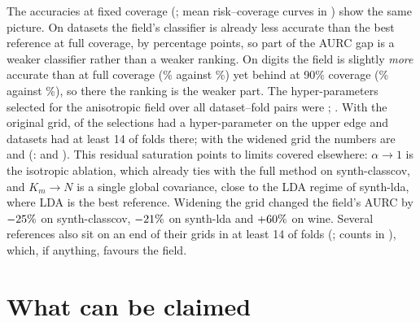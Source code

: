 \documentclass[10pt,a4paper]{article}
\theoremstyle{plain}
\theoremstyle{definition}
\theoremstyle{remark}
\begin{document}
The accuracies at fixed coverage (; mean risk--coverage curves in ) show the same picture. On \AccGapBigN{} datasets the field's classifier is already less accurate than the best reference at full coverage, by \AccGapBigText{} percentage points, so part of the AURC gap is a weaker classifier rather than a weaker ranking. On digits the field is slightly \emph{more} accurate than \BestRefDigits{} at full coverage (\AccDigitsFaniso\% against \AccDigitsDann\%) yet behind at 90\% coverage (\AccNinetyDigitsFaniso\% against \AccNinetyDigitsDann\%), so there the ranking is the weaker part. The hyper-parameters selected for the anisotropic field over all \AlphaTotal{} dataset--fold pairs were \AlphaFracText; \KmFracText. With the original grid, \VTwoSatFanisoAnyHigh{} of the \SatFanisoTotal{} selections had a hyper-parameter on the upper edge and \VTwoSatFanisoDsHighN{} datasets had at least 14 of \MetaFolds{} folds there; with the widened grid the numbers are \SatFanisoAnyHigh{} and \SatFanisoDsHighN{} (\SatFanisoDsHighList: \SelCcov{} and \SelSlda). This residual saturation points to limits covered elsewhere: $\alpha\to1$ is the isotropic ablation, which already ties with the full method on synth-classcov, and $K_m\to N$ is a single global covariance, close to the LDA regime of synth-lda, where LDA is the best reference. Widening the grid changed the field's AURC by $-25\%$ on synth-classcov, $-21\%$ on synth-lda and $+60\%$ on wine. Several references also sit on an end of their grids in at least 14 of \MetaFolds{} folds (\SatRefText; counts in ), which, if anything, favours the field.

\FloatBarrier
\section{What can be claimed}\label{sec:claims}
\end{document}
